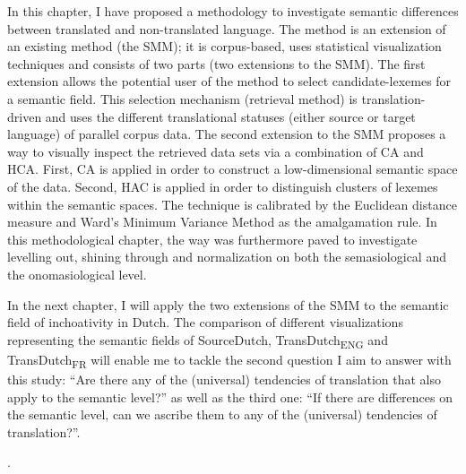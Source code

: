 In this chapter, I have proposed a methodology to investigate semantic differences between translated and non-translated language. The method is an extension of an existing method (the SMM); it is corpus-based, uses statistical visualization techniques and consists of two parts (two extensions to the SMM). The first extension allows the potential user of the method to select candidate-lexemes for a semantic field. This selection mechanism (retrieval method) is translation-driven and uses the different translational statuses (either source or target language) of parallel corpus data. The second extension to the SMM proposes a way to visually inspect the retrieved data sets via a combination of CA and HCA. First, CA is applied in order to construct a low-dimensional semantic space of the data. Second, HAC is applied in order to distinguish clusters of lexemes within the semantic spaces. The technique is calibrated by the Euclidean distance measure and Ward’s Minimum Variance Method as the amalgamation rule. In this methodological chapter, the way was furthermore paved to investigate levelling out, shining through and normalization on both the semasiological and the onomasiological level.



In the next chapter, I will apply the two extensions of the SMM to the semantic field of inchoativity in Dutch. The comparison of different visualizations representing the semantic fields of SourceDutch, TransDutch\textsubscript{ENG} and TransDutch\textsubscript{FR} will enable me to tackle the second question I aim to answer with this study: “Are there any of the (universal) tendencies of translation that also apply to the semantic level?” as well as the third one: “If there are differences on the semantic level, can we ascribe them to any of the (universal) tendencies of translation?”.



.


